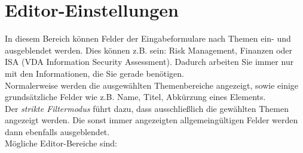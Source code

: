 \documentclass[a4paper,10pt]{book}
\begin{document}
\section{Editor-Einstellungen}
In diesem Bereich können Felder der Eingabeformulare nach Themen ein- und ausgeblendet werden. Dies können z.B. sein: Risk Management,
Finanzen oder ISA (VDA Information Security Assessment). Dadurch arbeiten Sie immer nur mit den Informationen, die Sie gerade benötigen.
\newline\\
Normalerweise werden die ausgewählten Themenbereiche angezeigt, sowie einige grundsätzliche Felder wie z.B. Name, Titel, Abkürzung eines Elements.
\newline\\
Der {\em strikte Filtermodus} führt dazu, dass ausschließlich die gewählten Themen angezeigt werden. Die sonst immer angezeigten allgemeingültigen
Felder werden dann ebenfalls ausgeblendet.
\newline\\
Mögliche Editor-Bereiche sind:
\end{document}
